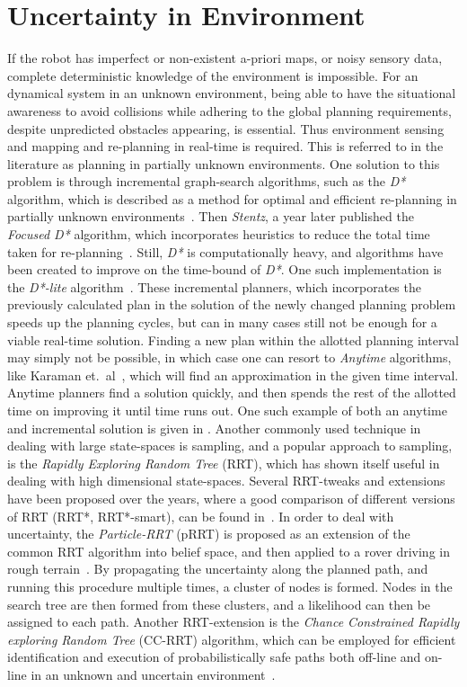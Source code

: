 \section{Uncertainty in Environment}
If the robot has imperfect or non-existent a-priori maps, or noisy sensory data,
complete deterministic knowledge of the environment is impossible. For an
dynamical system in an unknown environment, being able to have the situational
awareness to avoid collisions while adhering to the global planning
requirements, despite unpredicted obstacles appearing, is essential. Thus
environment sensing and mapping and re-planning in real-time is required. This
is referred to in the literature as planning in partially unknown environments.
One solution to this problem is through incremental graph-search algorithms,
such as the \textsl{D*} algorithm, which is described as a method for optimal
and efficient re-planning in partially unknown environments~\cite{Stentz_1997}.
Then \textit{Stentz}, a year later published the \textit{Focused D*} algorithm,
which incorporates heuristics to reduce the total time taken for
re-planning~\cite{Stentz:1995:FDA:1643031.1643113}. Still, \textit{D*} is
computationally heavy, and algorithms have been created to improve on the
time-bound of \textit{D*}. One such implementation is the \textit{D*-lite}
algorithm~\cite{koenig2002d}. These incremental planners, which incorporates the
previously calculated plan in the solution of the newly changed planning problem
speeds up the planning cycles, but can in many cases still not be enough for a
viable real-time solution. Finding a new plan within the allotted planning
interval may simply not be possible, in which case one can resort to
\textit{Anytime} algorithms, like Karaman et.\
al~\cite{karamanAnytimeMotionPlanning2011}, which will find an approximation in
the given time interval. Anytime planners find a solution quickly, and then
spends the rest of the allotted time on improving it until time runs out. One
such example of both an anytime and incremental solution is given in
\textcite{likhachevAnytimeSearchDynamic2008}. Another commonly used technique in
dealing with large state-spaces is sampling, and a popular approach to sampling,
is the \textit{Rapidly Exploring Random Tree} (RRT), which has shown itself
useful in dealing with high dimensional state-spaces. Several RRT-tweaks and
extensions have been proposed over the years, where a good comparison of
different versions of RRT (RRT*, RRT*-smart), can be found
in~\textcite{noreenComparisonRRTRRT2016}. In order to deal with uncertainty, the
\textit{Particle-RRT} (pRRT) is proposed as an extension of the common RRT
algorithm into belief space, and then applied to a rover driving in rough
terrain~\cite{melchiorParticleRRTPath2007}. By propagating the uncertainty along
the planned path, and running this procedure multiple times, a cluster of nodes
is formed. Nodes in the search tree are then formed from these clusters, and a
likelihood can then be assigned to each path. Another RRT-extension is the
\textit{Chance Constrained Rapidly exploring Random Tree} (CC-RRT) algorithm, which can
be employed for efficient identification and execution of probabilistically safe
paths both off-line and on-line in an unknown and uncertain
environment~\cite{Luders_2013}.

